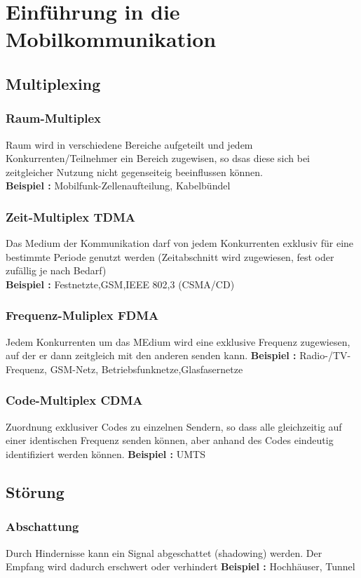 \section{Einführung in die Mobilkommunikation}
\subsection{Multiplexing}
\subsubsection{Raum-Multiplex}
Raum wird in verschiedene Bereiche aufgeteilt und jedem Konkurrenten/Teilnehmer ein Bereich zugewisen, so dsas diese sich bei zeitgleicher Nutzung nicht gegenseiteig beeinflussen können. \\
\textbf{Beispiel :} Mobilfunk-Zellenaufteilung, Kabelbündel

\subsubsection{Zeit-Multiplex TDMA}
Das Medium der Kommunikation darf von jedem Konkurrenten exklusiv für eine bestimmte Periode genutzt werden (Zeitabschnitt wird zugewiesen, fest oder zufällig je nach Bedarf) \\
\textbf{Beispiel :} Festnetzte,GSM,IEEE 802,3 (CSMA/CD)

\subsubsection{Frequenz-Muliplex FDMA}
Jedem Konkurrenten um das MEdium wird eine exklusive Frequenz zugewiesen, auf der er dann zeitgleich mit den anderen senden kann.
\textbf{Beispiel :} Radio-/TV-Frequenz, GSM-Netz, Betriebsfunknetze,Glasfasernetze

\subsubsection{Code-Multiplex CDMA}
Zuordnung exklusiver Codes zu einzelnen Sendern, so dass alle gleichzeitig auf einer identischen Frequenz senden können, aber anhand des Codes eindeutig identifiziert werden können.
\textbf{Beispiel :} UMTS

\subsection{Störung}
\subsubsection{Abschattung}
Durch Hindernisse kann ein Signal abgeschattet (shadowing) werden. Der Empfang wird dadurch erschwert oder verhindert
\textbf{Beispiel :} Hochhäuser, Tunnel

